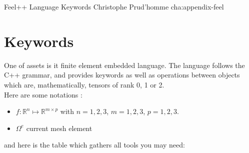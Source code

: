             {Feel++ Language Keywords}
            {Christophe Prud'homme}
            {cha:appendix-feel}

\section{Keywords}

One of \feel assets is it finite element embedded language. The language follows the C++ grammar, and provides keywords
as well as operations between objects which are, mathematically, tensors of rank 0, 1 or 2. \\

\noindent Here are some notations :
\begin{itemize}
\item $f: \mathbb{R}^n \mapsto \mathbb{R}^{m\times p}$  with $n=1,2,3$, $m=1,2,3$, $p=1,2,3$.
\item $\Omega^e$ current mesh element
\end{itemize}
and here is the table which gathers all tools you may need:

